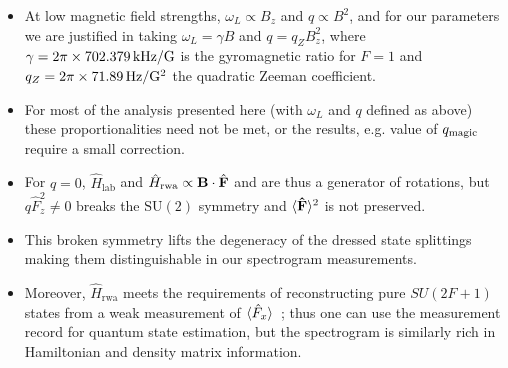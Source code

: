 \documentclass[aps,prl,reprint,superscriptaddress,floatfix]{revtex4-1}
\begin{document}
\begin{itemize}
    \item At low magnetic field strengths, $\omega_L \propto B_z$ and $q \propto B^2$, and for our parameters we are justified in taking $\omega_L = \gamma B$ and $q = q_Z B_z^2$, where $\gamma = 2\pi \times \unit[702.379]{kHz/G}$ is the gyromagnetic ratio for \Rb $F=1$ and $q_Z = 2\pi \times \unit[71.89]{Hz/G^2}$ the quadratic Zeeman coefficient.
    \item[\checkmark] For most of the analysis presented here (with $\omega_L$ and $q$ defined as above) these proportionalities need not be met, or the results, e.g. value of $q_{\text{magic}}$ require a small correction. 
    \item For $q=0$, $\hat{H}_{\text{lab}}$ and $\hat{H}_{\text{rwa}} \propto \mathbf{B} \cdot \hat{\mathbf{F}}$ and are thus a generator of rotations, but $q \hat{F}_z^2 \neq 0$ breaks the $\text{SU}(2)$ symmetry and $\langle \mathbf{\hat{F}} \rangle^2$ is not preserved.
    \item This broken symmetry lifts the degeneracy of the dressed state splittings making them distinguishable in our spectrogram measurements.
    \item Moreover, $\hat{H}_{\text{rwa}}$ meets the requirements of reconstructing pure $SU(2F+1)$ states from a weak measurement of $\langle \hat{F}_x \rangle$~\cite{merkel_random_2010}; thus one can use the measurement record for quantum state estimation, but the spectrogram is similarly rich in Hamiltonian and density matrix information.
\end{itemize}
    
\end{document}
